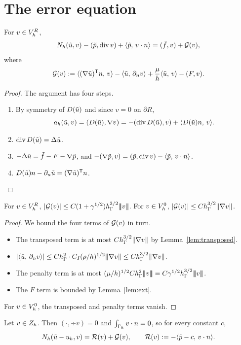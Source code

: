 \section{The error equation}\label{sec:erroreq}

\begin{lemma}\label{lem:erroreq}
For $v\in V_h^R$,
\[
N_h(\tilde u,v)-(\tilde p,\operatorname{div} v)+\langle \tilde p,\, v\cdot n\rangle=(\tilde f,v)+\mathcal G(v),
\]
where
\[
\mathcal G(v):=\langle (\nabla\tilde u)^{\mathsf T}n,\, v\rangle-\langle \tilde u,\, \partial_n v\rangle+\frac\mu h\langle \tilde u,\, v\rangle-(F,v).
\]
\end{lemma}

\begin{proof}
The argument has four steps.
\begin{enumerate}
\item By symmetry of $D(\tilde u)$ and since $v=0$ on $\partial R$,
\[
a_h(\tilde u,v)=(D(\tilde u),\nabla v)=-(\operatorname{div} D(\tilde u),v)+\langle D(\tilde u)n,\, v\rangle.
\]
\item $\operatorname{div} D(\tilde u)=\Delta\tilde u$.
\item $-\Delta\tilde u=\tilde f-F-\nabla\tilde p$, and $-(\nabla\tilde p,v)=(\tilde p,\operatorname{div} v)-\langle \tilde p,\, v\cdot n\rangle$.
\item $D(\tilde u)n-\partial_n\tilde u=(\nabla\tilde u)^{\mathsf T}n$.\qedhere
\end{enumerate}
\end{proof}

\begin{lemma}\label{lem:Gbound}
For $v\in V_h^R$, $|\mathcal G(v)|\le C(1+\gamma^{1/2})h_\Gamma^{3/2}|\!|\!|v|\!|\!|$. For $v\in V_h^0$, $|\mathcal G(v)|\le Ch_\Gamma^{3/2}\lVert \nabla v\rVert$.
\end{lemma}

\begin{proof}
We bound the four terms of $\mathcal G(v)$ in turn.
\begin{itemize}
\item The transposed term is at most $Ch_\Gamma^{3/2}\lVert \nabla v\rVert$ by Lemma~\ref{lem:transposed}.
\item $|\langle \tilde u,\, \partial_n v\rangle|\le Ch_\Gamma^2\cdot C_I(\rho/h)^{1/2}\lVert \nabla v\rVert\le Ch_\Gamma^{3/2}\lVert \nabla v\rVert$.
\item The penalty term is at most $(\mu/h)^{1/2}C\hG^2\tnorm v=C\gamma^{1/2}\hG^{3/2}\tnorm v$.
\item The $F$ term is bounded by Lemma~\ref{lem:ext}.
\end{itemize}
For $v\in V_h^0$, the transposed and penalty terms vanish.
\end{proof}

\begin{corollary}[$\GS$ on $\Zh$]\label{cor:GSerr}
Let $v\in Z_h$. Then $(\cdot,\div v)=0$ and $\int_{\Gamma_h}v\cdot n=0$, so for every constant $c$,
\[
N_h(\tilde u-u_h,v)=\mathcal R(v)+\mathcal G(v),\qquad \mathcal R(v):=-\langle \tilde p-c,\, v\cdot n\rangle.
\]
\end{corollary}
